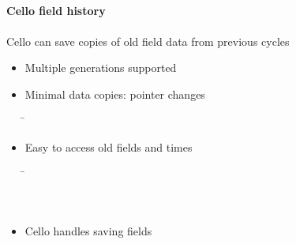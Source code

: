 \NEWSEC
% 
%


\subsection{\ssRecentHistory}

\begin{frame}[fragile,label=ss-recent-history] 
\secframetitle{\ssRecentHistory}
\framesubtitle{Cello field history}
Cello can save copies of old field data from previous cycles

\begin{itemize}
\item Multiple generations supported
\item Minimal data copies: pointer changes
\begin{tabbing}
\= \kill
\> 
\end{tabbing}
\item Easy to access old fields and times
\begin{tabbing}
\= \kill
\>  \\
\>  \\
\>  \\
\> 
\end{tabbing}
\item Cello handles saving fields
\end{itemize}
\end{frame}

